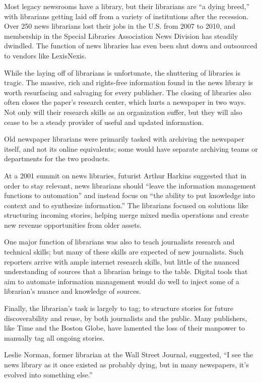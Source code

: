 Most legacy newsrooms have a library, but their librarians are ``a dying breed,'' with librarians getting laid off from a variety of institutions after the recession. Over 250 news librarians lost their jobs in the U.S. from 2007 to 2010, and membership in the Special Libraries Association News Division has steadily dwindled. The function of news libraries has even been shut down and outsourced to vendors like LexisNexis.

While the laying off of librarians is unfortunate, the shuttering of libraries is tragic. The massive, rich and rights-free information found in the news library is worth resurfacing and salvaging for every publisher. The closing of libraries also often closes the paper's research center, which hurts a newspaper in two ways. Not only will their research skills as an organization suffer, but they will also cease to be a steady provider of useful and updated information.

Old newspaper librarians were primarily tasked with archiving the newspaper itself, and not its online equivalents; some would have separate archiving teams or departments for the two products.

At a 2001 summit on news libraries, futurist Arthur Harkins suggested that in order to stay relevant, news librarians should ``leave the information management functions to automation'' and instead focus on ``the ability to put knowledge into context and to synthesize information.'' The librarians focused on solutions like structuring incoming stories, helping merge mixed media operations and create new revenue opportunities from older assets.

One major function of librarians was also to teach journalists research and technical skills; but many of these skills are expected of new journalists. Such reporters arrive with ample internet research skills, but little of the nuanced understanding of sources that a librarian brings to the table. Digital tools that aim to automate information management would do well to inject some of a librarian's nuance and knowledge of sources.

Finally, the librarian's task is largely to tag; to structure stories for future discoverability and reuse, by both journalists and the public. Many publishers, like Time and the Boston Globe, have lamented the loss of their manpower to manually tag all ongoing stories. 

Leslie Norman, former librarian at the Wall Street Journal, suggested, ``I see the news library as it once existed as probably dying, but in many newspapers, it's evolved into something else.'' 

